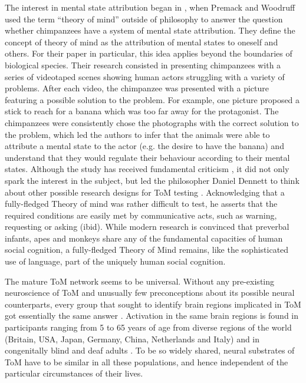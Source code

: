 \documentclass[output=paper]{LSP/langsci}
\begin{document}
The interest in mental state attribution began in \citeyear{Premack1978}, when Premack and Woodruff used the term ``theory of mind'' outside of philosophy to answer the question whether chimpanzees have a system of mental state attribution. They define the concept of theory of mind as the attribution of mental states to oneself and others. For their paper in particular, this idea applies beyond the boundaries of biological species. Their research consisted in presenting chimpanzees with a series of videotaped scenes showing human actors struggling with a variety of problems. After each video, the chimpanzee was presented with a picture featuring a possible solution to the problem. For example, one picture proposed a stick to reach for a banana which was too far away for the protagonist. The chimpanzees were consistently chose the photographs with the correct solution to the problem, which led the authors to infer that the animals were able to attribute a mental state to the actor (e.g. the desire to have the banana) and understand that they would regulate their behaviour according to their mental states. Although the study has received fundamental criticism \citep{Call2008}, it did not only spark the interest in the subject, but led the philosopher Daniel Dennett to think about other possible research designs for ToM testing \citeyearpar{Dennett1978}. Acknowledging that a fully-fledged Theory of mind was rather difficult to test, he asserts that the required conditions are easily met by communicative acts, such as warning, requesting or asking (ibid). While modern research is convinced that preverbal infants, apes and monkeys share any of the fundamental capacities of human social cognition, a fully-fledged Theory of Mind remains, like the sophisticated use of language, part of the uniquely human social cognition. 


The mature ToM network seems to be universal. Without any pre-existing neuroscience of ToM and unusually few preconceptions about its possible neural counterparts, every group that sought to identify brain regions implicated in ToM got essentially the same answer \citep{Saxe2010}. Activation in the same brain regions is found in participants ranging from 5 to 65 years of age from diverse regions of the world (Britain, USA, Japan, Germany, China, Netherlands and Italy) and in congenitally blind and deaf adults \citep{KosterHale2013}. To be so widely shared, neural substrates of ToM have to be similar in all these populations, and hence independent of the particular circumstances of their lives.
\end{document}
